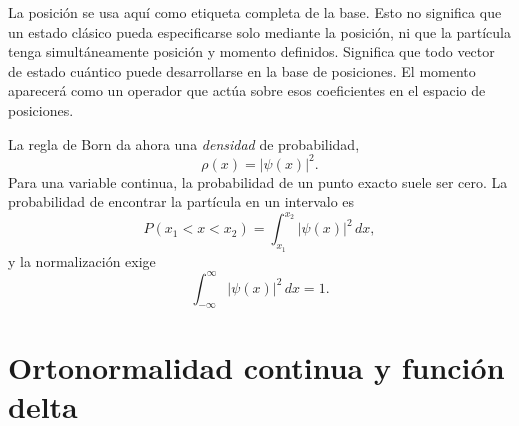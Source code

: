 La posición se usa aquí como etiqueta completa de la base. Esto no significa que un estado clásico pueda especificarse solo mediante la posición, ni que la partícula tenga simultáneamente posición y momento definidos. Significa que todo vector de estado cuántico puede desarrollarse en la base de posiciones. El momento aparecerá como un operador que actúa sobre esos coeficientes en el espacio de posiciones.

La regla de Born da ahora una \emph{densidad} de probabilidad,
\begin{equation}
\rho(x)=|\psi(x)|^2.
\label{eq:l8-probability-density}
\end{equation}
Para una variable continua, la probabilidad de un punto exacto suele ser cero. La probabilidad de encontrar la partícula en un intervalo es
\begin{equation}
P(x_1<x<x_2)
=
\int_{x_1}^{x_2}|\psi(x)|^2\,dx,
\end{equation}
y la normalización exige
\begin{equation}
\int_{-\infty}^{\infty}|\psi(x)|^2\,dx=1.
\label{eq:l8-continuous-normalization}
\end{equation}

\begin{classroomqa}
\end{classroomqa}

\begin{classroomqa}
\end{classroomqa}

\section{Ortonormalidad continua y función delta}

